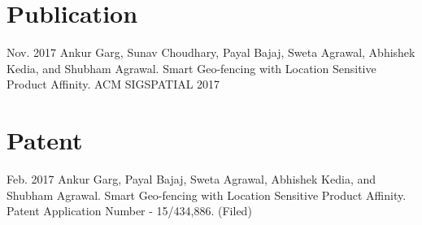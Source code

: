 \section{Publication}


\cvitem
	{Nov. 2017}
	{Ankur Garg, Sunav Choudhary, Payal Bajaj, Sweta Agrawal, Abhishek Kedia, and Shubham Agrawal. Smart Geo-fencing with Location Sensitive Product Affinity. ACM SIGSPATIAL 2017}
\section{Patent}
\cvitem
	{Feb. 2017}
	{Ankur Garg, Payal Bajaj, Sweta Agrawal, Abhishek Kedia, and Shubham Agrawal. Smart Geo-fencing with Location Sensitive Product Affinity. Patent Application Number - 15/434,886. (Filed)}